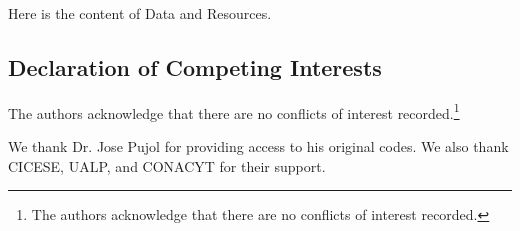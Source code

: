 \documentclass[linenum]{SSA-SRL}
\newtheorem{proposition}{Proposition}
\begin{document}





\begin{datres}%
Here is the content of Data and Resources.
\end{datres}

\subsection{Declaration of Competing Interests}

The authors acknowledge that there are no conflicts of interest recorded.\footnote{The authors acknowledge that there are no conflicts of interest recorded.}

\begin{ack}%

We thank Dr. Jose Pujol for providing access to his original codes. We also thank CICESE, UALP, and CONACYT for their support.
\end{ack}


\end{document}
